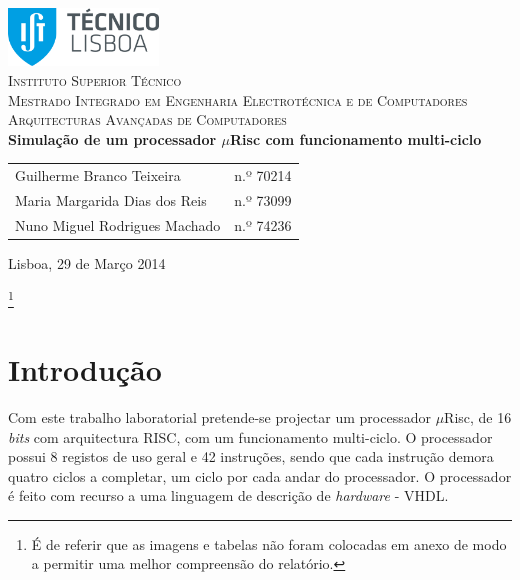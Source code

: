 \documentclass[11pt]{article}
\numberwithin{equation}{section}
\begin{document}
\begin{titlepage}
\begin{center}

\hfill \break
\hfill \break

\includegraphics[width=0.3\textwidth]{./logo}~\\[1cm]

\textsc{\LARGE Instituto Superior Técnico}\\[0.25cm]
\textsc{\Large Mestrado Integrado em Engenharia Electrotécnica e de Computadores}\\[1.8cm]
\textsc{\huge Arquitecturas Avançadas de Computadores}\\[0.25cm]

{\huge \bfseries Simulação de um processador $\mu$Risc com funcionamento multi-ciclo\\[1.2cm]}

\begin{tabular}{ l l }
Guilherme Branco Teixeira & \hspace{2mm} n.º 70214 \\ 
Maria Margarida Dias dos Reis & \hspace{2mm} n.º 73099 \\
Nuno Miguel Rodrigues Machado & \hspace{2mm} n.º 74236 
\end{tabular}

\vfill

{\large Lisboa, 29 de Março 2014} 

\end{center}
\end{titlepage}
 
\clearpage

\footnote{É de referir que as imagens e tabelas não foram colocadas em anexo de modo a permitir uma melhor compreensão do relatório.}

\tableofcontents
\pagebreak

\clearpage
{}

\section{Introdução}

Com este trabalho laboratorial pretende-se projectar um processador $\mu$Risc, de 16 \textit{bits} com arquitectura RISC, com um funcionamento multi-ciclo. O processador possui 8 registos de uso geral e 42 instruções, sendo que cada instrução demora quatro ciclos a completar, um ciclo por cada andar do processador. O processador é feito com recurso a uma linguagem de descrição de \textit{hardware} - VHDL.
\end{document}
